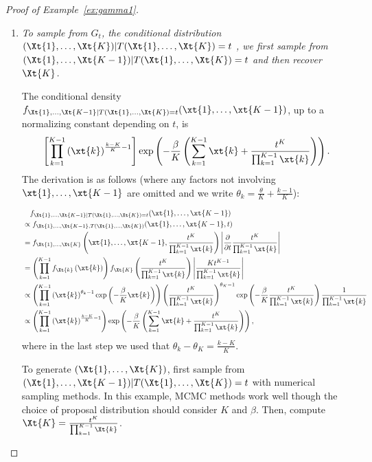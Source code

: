 \documentclass[12pt]{article}
\begin{document}
\begin{proof}[Proof of Example~\ref{ex:gamma1}]
\begin{enumerate}
    By the factorization theorem, $T(\Xt{1},\dots,\Xt{K})=\left(\prod_{k=1}^K \Xt{k}\right)^{\frac{1}{K}}$ is a sufficient statistic for $\theta$ as required.

    \item \emph{To sample from $G_t$, the conditional distribution $(\Xt{1},\dots,\Xt{K})|T(\Xt{1},\dots,\Xt{K})=t$
    , we first sample from $(\Xt{1},\dots,\Xt{K-1})|T(\Xt{1},\dots,\Xt{K})=t$ and then recover $\Xt{K}$.}

The conditional density $f_{\Xt{1},\dots,\Xt{K-1}|T(\Xt{1},\dots,\Xt{K})=t}(\xt{1},\dots,\xt{K-1})$, up to a normalizing constant depending on $t$, is
$$
\left[\prod_{k=1}^{K-1}\left(\xt{k}\right)^{\frac{k-K}{K}-1}\right]\exp\left(-\frac{\beta}{K}\left(\sum_{k=1}^{K-1}\xt{k} + \frac{t^K}{\prod_{k=1}^{K-1}\xt{k}}\right)\right).
$$
The derivation is as follows (where any factors not involving $\xt{1},\ldots,\xt{K-1}$ are omitted and we write $\theta_k=\frac{\theta}{K}+\frac{k-1}{K}$):

\begin{align*}
&\quad f_{\Xt{1},\dots,\Xt{K-1}|T(\Xt{1},\dots,\Xt{K})=t}(\xt{1},\dots,\xt{K-1}) \\ 
&\propto f_{\Xt{1},\dots,\Xt{K-1},T(\Xt{1},\dots,\Xt{K})}(\xt{1},\dots,\xt{K-1},t) \\
&= f_{\Xt{1},\dots,\Xt{K}}\left(\xt{1},\dots,\xt{K-1},\frac{t^K}{\prod_{k=1}^{K-1}\xt{k}}\right)\left|\frac{\partial}{\partial t}\frac{t^K}{\prod_{k=1}^{K-1}\xt{k}}\right| \\
&=\left(\prod_{k=1}^{K-1}f_{\Xt{k}}\left(\xt{k}\right)\right)f_{\Xt{K}}\left(\frac{t^K}{\prod_{k=1}^{K-1}\xt{k}}\right)\left|\frac{Kt^{K-1}}{\prod_{k=1}^{K-1}\xt{k}}\right| \\
&\propto \left(\prod_{k=1}^{K-1}\left(\xt{k}\right)^{\theta_k-1}\exp\left(-\frac{\beta}{K}\xt{k}\right)\right) \left(\frac{t^K}{\prod_{k=1}^{K-1}\xt{k}}\right)^{\theta_K-1}\exp\left(-\frac{\beta}{K}\frac{t^K}{\prod_{k=1}^{K-1}\xt{k}}\right)\frac{1}{\prod_{k=1}^{K-1}\xt{k}} \\
&\propto \left(\prod_{k=1}^{K-1}\left(\xt{k}\right)^{\frac{k-K}{K}-1}\right)\exp\left(-\frac{\beta}{K}\left(\sum_{k=1}^{K-1}\xt{k}+\frac{t^K}{\prod_{k=1}^{K-1}\xt{k}}\right)\right),
\end{align*}
where in the last step we used that $\theta_k-\theta_K=\frac{k-K}{K}$.

To generate $(\Xt{1},\dots,\Xt{K})$, first sample from $(\Xt{1},\dots,\Xt{K-1})|T(\Xt{1},\dots,\Xt{K})=t$ with numerical sampling methods. In this example, MCMC methods work well though the choice of proposal distribution should consider $K$ and $\beta$. Then, compute $\Xt{K}=\frac{t^K}{\prod_{k=1}^{K-1}\Xt{k}}$. 
\end{enumerate}
\end{proof}
\end{document}
